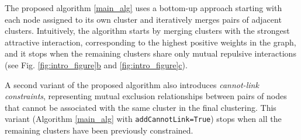 The proposed algorithm \ref{main_alg} uses a bottom-up approach starting with each node assigned to its own cluster and iteratively merges pairs of adjacent clusters. Intuitively, the algorithm starts by merging clusters with the strongest attractive interaction, corresponding to the highest positive weights in the graph, and it stops when the remaining clusters share only mutual repulsive interactions (see Fig. \hyperref[fig:intro_figure]{\ref*{fig:intro_figure}b} and \hyperref[fig:intro_figure]{\ref*{fig:intro_figure}c}). 

A second variant of the proposed algorithm also introduces \emph{cannot-link constraints}, representing mutual exclusion relationships between pairs of nodes that cannot be associated with the same cluster in the final clustering. This variant (Algorithm \ref{main_alg} with \texttt{addCannotLink=True}) stops when all the remaining clusters have been previously constrained.

